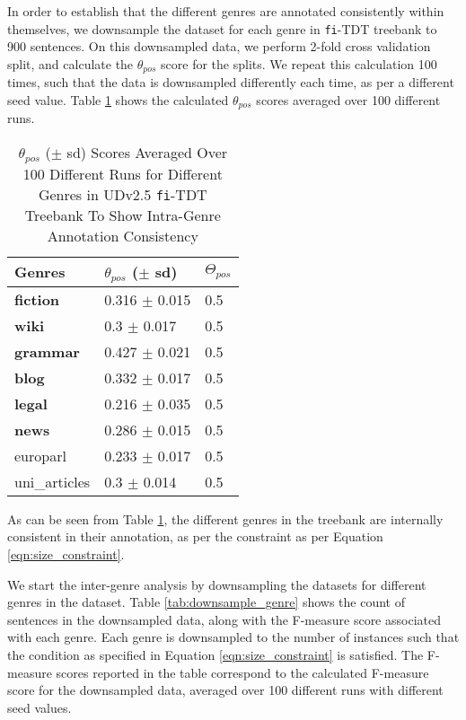 In order to establish that the different genres are annotated consistently within themselves, we downsample the dataset for each genre in \texttt{fi}-TDT treebank to 900 sentences. On this downsampled data, we perform 2-fold cross validation split, and calculate the $\theta_{pos}$ score for the splits. We repeat this calculation 100 times, such that the data is downsampled differently each time, as per a different seed value. Table \ref{tab:genre_all_kfold} shows the calculated $\theta_{pos}$ scores averaged over 100 different runs.

\begin{table}[H]
    \centering
    \begin{tabular}{|l|l|l|}
        \hline
        \textbf{Genres} & \textbf{$\theta_{pos}$} ($\pm$ sd) & $\Theta_{pos}$\\
        \hline
        \textbf{fiction} & 0.316 $\pm$ 0.015 & 0.5\\
        \textbf{wiki} & 0.3 $\pm$ 0.017 & 0.5\\
        \textbf{grammar} & 0.427 $\pm$ 0.021 & 0.5\\
        \textbf{blog} & 0.332 $\pm$ 0.017 & 0.5\\
        \textbf{legal} & 0.216 $\pm$ 0.035 & 0.5\\
        \textbf{news} & 0.286 $\pm$ 0.015 & 0.5\\
        europarl & 0.233 $\pm$ 0.017 & 0.5\\
        uni\_articles & 0.3 $\pm$ 0.014 & 0.5\\
        \hline
    \end{tabular}
    \caption{$\theta_{pos}$ ($\pm$ sd) Scores Averaged Over 100 Different Runs for Different Genres in UDv2.5 \texttt{fi}-TDT Treebank To Show Intra-Genre Annotation Consistency}
    \label{tab:genre_all_kfold}
\end{table}

As can be seen from Table \ref{tab:genre_all_kfold}, the different genres in the treebank are internally consistent in their annotation, as per the constraint as per Equation \ref{eqn:size_constraint}.

We start the inter-genre analysis by downsampling the datasets for different genres in the dataset. Table \ref{tab:downsample_genre} shows the count of sentences in the downsampled data, along with the F-measure score associated with each genre. Each genre is downsampled to the number of instances such that the condition as specified in Equation \ref{eqn:size_constraint} is satisfied. The F-measure scores reported in the table correspond to the calculated F-measure score for the downsampled data, averaged over 100 different runs with different seed values.

